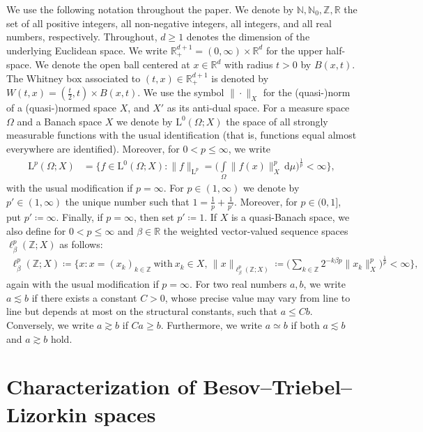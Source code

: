 \documentclass[11pt, leqno,parskip=half]{amsart}
\theoremstyle{definition}
\newcommand{\IR}{\mathbb{R}}
\newcommand{\IN}{\mathbb{N}}
\newcommand{\IZ}{\mathbb{Z}}
\renewcommand{\L}{\mathrm{L}}
\renewcommand{\d}{\mathrm{d}}
\numberwithin{equation}{section}
\begin{document}
We use the following notation throughout the paper.
We denote by $\IN,\IN_0,\IZ, \IR$ the set of all positive integers, all non-negative integers, all integers, and all real numbers, respectively. Throughout, $d\geq 1$ denotes the dimension of the underlying Euclidean space. We write $\IR^{d+1}_+ = (0,\infty)\times \IR^{d}$ for the upper half-space. We denote the open ball centered at $x\in \IR^d$ with radius $t>0$ by $B(x,t)$. The Whitney box associated to $(t,x)\in\IR^{d+1}_+$ is denoted by $W(t,x) = (\frac{t}{2},t) \times B(x,t)$. We use the symbol $\|\cdot\|_X$ for the (quasi-)norm of a (quasi-)normed space $X$, and $X'$ as its anti-dual space. For a measure space $\Omega$ and a Banach space $X$ we denote by $\L^0(\Omega;X)$ the space of all strongly measurable functions with the usual identification (that is, functions equal almost everywhere are identified). Moreover, for $0<p\leq \infty$, we write
\begin{align*}
    \L^p(\Omega; X) &= \bigg\{ f\in \L^0(\Omega;X): \|f\|_{\L^p} = \bigg(\int\limits_{\Omega} \|f(x)\|_X^p\,\d \mu\bigg)^\frac{1}{p}<\infty \bigg\},
\end{align*}
with the usual modification if $p=\infty$. For $p\in (1 ,\infty)$ we denote by $p'\in (1,\infty)$ the unique number such that $1 = \frac{1}{p} + \frac{1}{p'}$. Moreover, for $p\in(0,1]$, put $p'\coloneqq \infty$. Finally, if $p=\infty$, then set $p'\coloneqq 1$. If $X$ is a quasi-Banach space, we also define for $0<p\leq \infty$ and $\beta\in \IR$ the weighted vector-valued sequence spaces $\ell^p_\beta(\IZ;X)$ as follows:
\begin{align*}
    \ell^p_\beta(\IZ;X)\coloneqq \Big\{ x: x=(x_k)_{k\in \IZ}\ \text{with}\ x_k\in X,\, \|x\|_{\ell^p_\beta(\IZ;X)} \coloneqq \Big(\sum\limits_{k\in\IZ} 2^{-k\beta p}\|x_k\|_X^p\Big)^\frac{1}{p}<\infty \Big\},
\end{align*}
again with the usual modification if $p=\infty$.
For two real numbers $a,b$, we write $a\lesssim b$ if there exists a constant $C>0$, whose precise value may vary from line to line but depends at most on the structural constants, such that $a\leq Cb$. Conversely, we write $a\gtrsim b$ if $Ca\geq b$. Furthermore, we write $a\simeq b$ if both $a\lesssim b$ and $a\gtrsim b$ hold.

\section{Characterization of Besov--Triebel--Lizorkin spaces}
\label{sec: characterizations}
\end{document}
